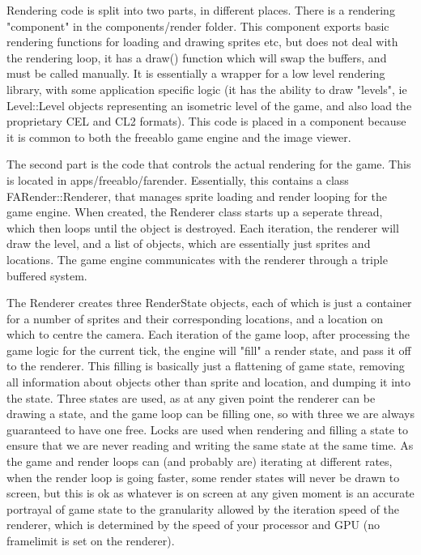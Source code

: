     Rendering code is split into two parts, in different places. There is a rendering "component" in the components/render folder.
    This component exports basic rendering functions for loading and drawing sprites etc, but does not deal with the rendering loop, it has a draw() function which will swap the buffers, and must be called manually.   
    It is essentially a wrapper for a low level rendering library, with some application specific logic (it has the ability to draw "levels", ie Level::Level objects representing an isometric level of the game, and also load the proprietary CEL and CL2 formats).
    This code is placed in a component because it is common to both the freeablo game engine and the image viewer.
    
    \mbox{}
    
    The second part is the code that controls the actual rendering for the game. This is located in apps/freeablo/farender. Essentially, this contains a class FARender::Renderer, that manages sprite loading and render looping for the game engine.  
    When created, the Renderer class starts up a seperate thread, which then loops until the object is destroyed. Each iteration, the renderer will draw the level, and a list of objects, which are essentially just sprites and locations.
    The game engine communicates with the renderer through a triple buffered system.
    
    The Renderer creates three RenderState objects, each of which is just a container for a number of sprites and their corresponding locations, and a location on which to centre the camera.
    Each iteration of the game loop, after processing the game logic for the current tick, the engine will "fill" a render state, and pass it off to the renderer. This filling is basically just a flattening of game state, removing all information about objects other than sprite and location, and dumping it into the state.
    Three states are used, as at any given point the renderer can be drawing a state, and the game loop can be filling one, so with three we are always guaranteed to have one free.
    Locks are used when rendering and filling a state to ensure that we are never reading and writing the same state at the same time.
    As the game and render loops can (and probably are) iterating at different rates, when the render loop is going faster, some render states will never be drawn to screen, but this is ok as whatever is on screen at any given moment is an accurate portrayal of game state to the granularity allowed by the iteration speed of the renderer, which is determined by the speed of your processor and GPU (no framelimit is set on the renderer).
        

